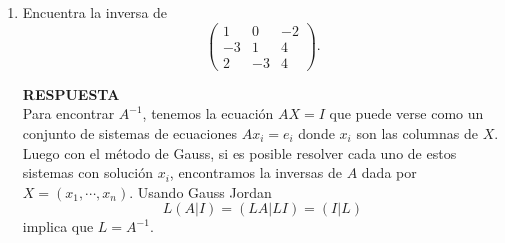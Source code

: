 \documentclass[11pt,letterpaper]{article}
\newcommand{\res}{\textbf{RESPUESTA}\\}
\newcommand{\finf}{\blacksquare.}
\begin{document}
\begin{enumerate}
\begin{equation*}
\begin{array}{c}
\begin{array}{rrrrrr}
0  &  0 & 0 &  0 & 0 & 1
\end{array}\right) 
\end{array}
\end{equation*}
Por lo anterior encontramos que $x_6=0$ y $x_5=0$ del reglón 3 y 4 respectivamente. Del renglón 2 obtenemos que $x_3=-2x_4$ y del renglón 1 $x_1=3x_2+3x_4.$ Por lo que la solución general es
$$x=\begin{pmatrix}
3x_2+3x_4\\
x_2\\
-2x_4\\
x_4\\
0\\
0
\end{pmatrix},
$$
la cual se puede escribir como combinación lineal de la siguiente forma:
$$x=\left\{ x_2\begin{pmatrix}
3\\
1\\
0\\
0\\
0\\
0
\end{pmatrix}+x_4\begin{pmatrix}
3\\
0\\
-2\\
1\\
0\\
0\\
\end{pmatrix} \right\} \ \ \ \ \ \ \finf$$

\item Encuentra la inversa de 
\begin{equation*}
\left(\begin{array}{rrr}
 1 &  0 & -2\\
-3 &  1 &  4\\
 2 & -3 &  4
\end{array}\right).
\end{equation*}

\res
Para encontrar $A^{-1}$, tenemos la ecuación $AX=I$ que puede verse como un conjunto de sistemas de ecuaciones $Ax_i=e_i$ donde $x_i$ son las columnas de $X$. Luego con el método de Gauss, si es posible resolver cada uno de estos sistemas con solución $x_i$, encontramos la inversas de $A$ dada por $X=(x_1, \cdots , x_n)$. Usando Gauss Jordan
$$L(A|I)=(LA|LI)=(I|L)$$
implica que $L=A^{-1}$. 


\end{enumerate}
\end{document}
